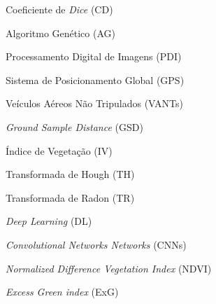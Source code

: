 
Coeficiente de \textit{Dice} (CD)

Algoritmo Genético (AG)

Processamento Digital de Imagens (PDI)

Sistema de Posicionamento Global (GPS)

Veículos Aéreos Não Tripulados (VANTs)

\textit{Ground Sample Distance} (GSD)

Índice de Vegetação (IV)

Transformada de Hough (TH)

Transformada de Radon (TR)

\textit{Deep Learning} (DL)

\textit{Convolutional Networks Networks} (CNNs) 

\textit{Normalized Difference Vegetation Index} (NDVI)

\textit{Excess Green index} (ExG)
